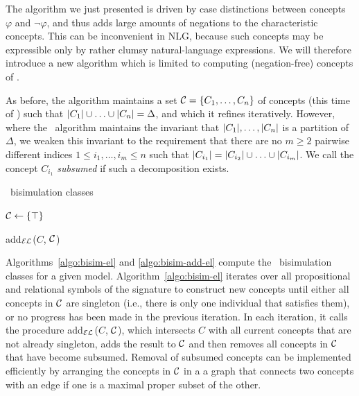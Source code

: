 The algorithm we just presented is driven by case distinctions between
concepts $\varphi$ and $\neg \varphi$, and thus adds large amounts of
negations to the characteristic concepts.  This can be inconvenient
in NLG, because such concepts may be expressible only by rather clumsy
natural-language expressions.   We will therefore
introduce a new algorithm which is limited to computing
(negation-free) concepts of \el.  

As before, the algorithm maintains a set $\mathcal{C} = \{C_1,\ldots,C_n\}$ of
concepts (this time of \el) such that $|C_1| \cup \ldots \cup
|C_n| = \Delta$, and which it refines iteratively.  However,
where the \alc\ algorithm maintains the invariant that
$|C_1|,\ldots,|C_n|$ is a partition of $\Delta$, we
weaken this invariant to the requirement that there are no $m \geq 2$
pairwise different indices $1 \leq i_1,\ldots,i_m \leq n$ such that
$|C_{i_1}| = |C_{i_2}| \cup \ldots \cup
|C_{i_m}|$.  We call the concept $C_{i_1}$ \emph{subsumed} if
such a decomposition exists.

\begin{algorithm}[t]
\dontprintsemicolon
\caption{\el\ bisimulation classes}
\label{algo:bisim-el}
$\mathcal{C} \leftarrow \{\top\}$ \;
\end{algorithm}


\begin{algorithm}[t]
\dontprintsemicolon
\caption{add$_\mathcal{EL}$($C$, $\mathcal{C}$)}
\label{algo:bisim-add-el}
\end{algorithm}

Algorithms~\ref{algo:bisim-el} and \ref{algo:bisim-add-el} compute
the \el\ bisimulation classes for a given model.
Algorithm~\ref{algo:bisim-el} iterates over all propositional and
relational symbols of the signature to construct new concepts until
either all concepts in $\mathcal{C}$ are singleton (i.e., there is only one
individual that satisfies them), or no progress has been made in the
previous iteration.  In each iteration, it calls the procedure
add$_\mathcal{EL}$($C$, $\mathcal{C}$), which intersects $C$ with all current concepts
that are not already singleton, adds the result to $\mathcal{C}$ and then
removes all concepts in $\mathcal{C}$ that have become subsumed.  Removal of
subsumed concepts can be implemented efficiently by arranging the
concepts in $\mathcal{C}$ in a a graph that connects two concepts with an edge
if one is a maximal proper subset of the other.

